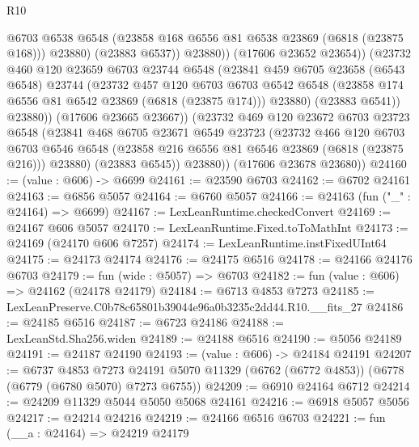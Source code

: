 \begin{lexlean}{R10}
\begin{coremodule}
                      @6703
                      @6538
                      @6548
                      (@23858 @168 @6556 @81 @6538 @23869 (@6818 (@23875 @168)))
                      @23880)
                    (@23883 @6537))
                  @23880))
              (@17606 @23652 @23654))
            (@23732
              @460
              @120
              @23659
              @6703
              @23744
              @6548
              (@23841
                @459
                @6705
                @23658
                (@6543 @6548)
                @23744
                (@23732
                  @457
                  @120
                  @6703
                  @6703
                  @6542
                  @6548
                  (@23858 @174 @6556 @81 @6542 @23869 (@6818 (@23875 @174)))
                  @23880)
                (@23883 @6541))
              @23880))
          (@17606 @23665 @23667))
        (@23732
          @469
          @120
          @23672
          @6703
          @23723
          @6548
          (@23841
            @468
            @6705
            @23671
            @6549
            @23723
            (@23732
              @466
              @120
              @6703
              @6703
              @6546
              @6548
              (@23858 @216 @6556 @81 @6546 @23869 (@6818 (@23875 @216)))
              @23880)
            (@23883 @6545))
          @23880))
      (@17606 @23678 @23680))
@24160 := (value : @606) -> @6699
@24161 := @23590 @6703
@24162 := @6702 @24161
@24163 := @6856 @5057
@24164 := @6760 @5057
@24166 := @24163 (fun ("_" : @24164) => @6699)
@24167 := LexLeanRuntime.checkedConvert
@24169 := @24167 @606 @5057
@24170 := LexLeanRuntime.Fixed.toToMathInt
@24173 := @24169 (@24170 @606 @7257)
@24174 := LexLeanRuntime.instFixedUInt64
@24175 := @24173 @24174
@24176 := @24175 @6516
@24178 := @24166 @24176 @6703
@24179 := fun (wide : @5057) => @6703
@24182 := fun (value : @606) => @24162 (@24178 @24179)
@24184 := @6713 @4853 @7273
@24185 := LexLeanPreserve.C0b78c65801b39044e96a0b3235c2dd44.R10.__fits_27
@24186 := @24185 @6516
@24187 := @6723 @24186
@24188 := LexLeanStd.Sha256.widen
@24189 := @24188 @6516
@24190 := @5056 @24189
@24191 := @24187 @24190
@24193 := (value : @606) -> @24184 @24191
@24207 := @6737
    @4853
    @7273
    @24191
    @5070
    @11329
    (@6762 (@6772 @4853))
    (@6778 (@6779 (@6780 @5070) @7273 @6755))
@24209 := @6910 @24164 @6712
@24214 := @24209 @11329 @5044 @5050 @5068 @24161
@24216 := @6918 @5057 @5056
@24217 := @24214 @24216
@24219 := @24166 @6516 @6703
@24221 := fun (__a : @24164) => @24219 @24179

\end{coremodule}
\end{lexlean}

